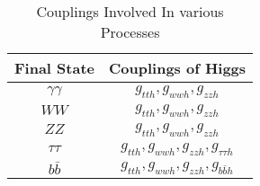 \documentclass[12pt]{article}
\begin{document}
\begin{table}[ht]
\caption{Couplings Involved In various Processes} %
\centering  %
\begin{tabular}{c c} %
\hline\hline                        %
Final State & Couplings of Higgs\\ [0.5ex] %
\hline                  %
$\gamma \gamma$ &  $g_{tth}, g_{wwh}, g_{zzh}$    \\ %
$WW$& $g_{tth}, g_{wwh}, g_{zzh}$  \\
$ZZ$ &  $g_{tth}, g_{wwh}, g_{zzh}$  \\
$\tau \tau $ &  $g_{tth}, g_{wwh}, g_{zzh},g_{\tau \tau h}$ \\
$b \bar b$ & $g_{tth}, g_{wwh}, g_{zzh},g_{b \bar b h}$  \\ [1ex]      %
\hline %
\end{tabular}
\label{table:nonlin} %
\end{table}
\end{document}
